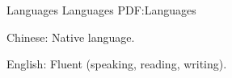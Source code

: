\Section
{Languages}
{Languages}
{PDF:Languages}

\BulletItem
Chinese: Native language.

\Gap
\BulletItem
English: Fluent (speaking, reading, writing).
